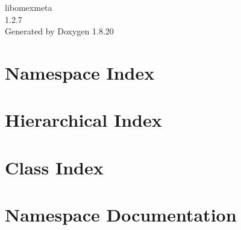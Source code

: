 \let\mypdfximage\pdfximage\def\pdfximage{\immediate\mypdfximage}\documentclass[twoside]{book}
\newcommand{\+}{\discretionary{\mbox{\scriptsize$\hookleftarrow$}}{}{}}
\newcommand{\clearemptydoublepage}{%
  \newpage{\pagestyle{empty}\cleardoublepage}%
}
\begin{document}
\hypersetup{pageanchor=false,
             bookmarksnumbered=true,
             pdfencoding=unicode
            }
\begin{titlepage}
\vspace*{7cm}
\begin{center}%
{\Large libomexmeta \\[1ex]\large 1.\+2.\+7 }\\
\vspace*{1cm}
{\large Generated by Doxygen 1.8.20}\\
\end{center}
\end{titlepage}
\clearemptydoublepage
{}
\tableofcontents
\clearemptydoublepage
{}
\hypersetup{pageanchor=true}

\chapter{Namespace Index}

\chapter{Hierarchical Index}

\chapter{Class Index}

\chapter{Namespace Documentation}

\end{document}
